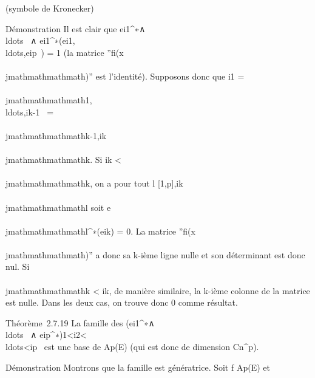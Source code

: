 (symbole de Kronecker)

Démonstration Il est clair que
ei1^∗∧\\ldots~
∧
ei1^∗(ei1,\\ldots,eip~)
= 1 (la matrice ''fi(x\\\\jmathmathmathmath)'' est l'identité).
Supposons donc que i1 =
\\\\jmathmathmathmath1,\\ldots,ik-1~
= \\\\jmathmathmathmathk-1,ik\neq~\\\\jmathmathmathmathk.
Si ik \textless{} \\\\jmathmathmathmathk, on a pour tout l \in
{[}1,p{]},ik\neq~\\\\jmathmathmathmathl soit
e\\\\jmathmathmathmathl^∗(eik) = 0. La
matrice ''fi(x\\\\jmathmathmathmath)'' a donc sa k-ième ligne nulle et
son déterminant est donc nul. Si \\\\jmathmathmathmathk \textless{} ik,
de manière similaire, la k-ième colonne de la matrice est nulle. Dans
les deux cas, on trouve donc 0 comme résultat.

Théorème~2.7.19 La famille des
(ei1^∗∧\\ldots~
∧
eip^∗)1\textless{}i2\textless{}\\ldots\textless{}ip\leqn~
est une base de Ap(E) (qui est donc de dimension
Cn^p).

Démonstration Montrons que la famille est génératrice. Soit f \in
Ap(E) et

